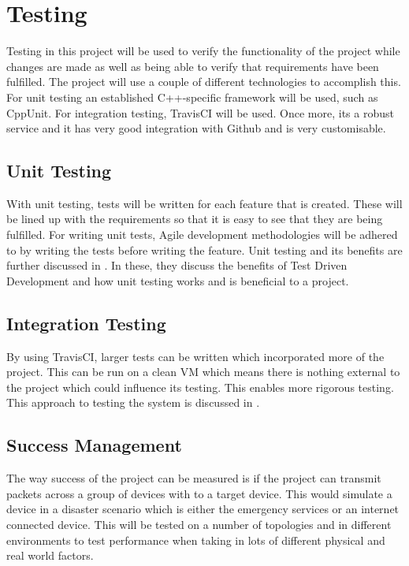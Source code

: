 \documentclass{report}
\begin{document}
\chapter*{Testing}

Testing in this project will be used to verify the functionality of the project while changes are made as 
well as being able to verify that requirements have been fulfilled. The project will use a couple of different 
technologies to accomplish this. For unit testing an established C++-specific framework will be used, such 
as CppUnit.
For integration testing, TravisCI will be used. Once more, its a robust service and it has very good integration with Github and 
is very customisable. 

\section*{Unit Testing}

With unit testing, tests will be written for each feature that is created. These will be lined up with the requirements so that 
it is easy to see that they are being fulfilled. For writing unit tests, Agile development methodologies will be adhered to by 
writing the tests before writing the feature. Unit testing and its benefits are further discussed in \cite{PressmanUnitIntegration, SommervilleTDD}. 
In these, they discuss the benefits of Test Driven Development and how unit testing works and is beneficial to a project. 

\section*{Integration Testing}

By using TravisCI, larger tests can be written which incorporated more of the project. This can be run on a clean VM which 
means there is nothing external to the project which could influence its testing. This enables more rigorous testing. This 
approach to testing the system is discussed in \cite{PressmanUnitIntegration}.

\section*{Success Management}

The way success of the project can be measured is if the project can transmit packets across a group of devices with to a 
target device. This would simulate a device in a disaster scenario which is either the emergency services or an internet 
connected device. This will be tested on a number of topologies and in different environments to test performance when taking 
in lots of different physical and real world factors.
\end{document}
